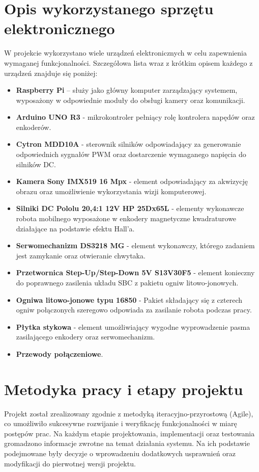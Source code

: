 \section{Opis wykorzystanego sprzętu elektronicznego}
W projekcie wykorzystano wiele urządzeń elektronicznych w celu zapewnienia wymaganej funkcjonalności. Szczegółowa lista wraz z krótkim opisem każdego z urządzeń znajduje się poniżej:

\begin{itemize}
    \item \textbf{Raspberry Pi} – służy jako główny komputer zarządzający systemem, wyposażony w odpowiednie moduły do obsługi kamery oraz komunikacji.
    \item \textbf{Arduino UNO R3} - mikrokontroler pełniący rolę kontrolera napędów oraz enkoderów.
    \item \textbf{Cytron MDD10A} - sterownik silników odpowiadający za generowanie odpowiednich sygnałów PWM oraz dostarczenie wymaganego napięcia do silników DC.
    \item \textbf{Kamera Sony IMX519 16 Mpx} - element odpowiadający za akwizycję obrazu oraz umożliwienie wykorzystania wizji komputerowej. 
    \item \textbf{Silniki DC Pololu 20,4:1 12V HP 25Dx65L} - elementy wykonawcze robota mobilnego wyposażone w enkodery magnetyczne kwadraturowe działające na podstawie efektu Hall'a.
    \item \textbf{Serwomechanizm DS3218 MG} - element wykonawczy, którego zadaniem jest zamykanie oraz otwieranie chwytaka.
    \item \textbf{Przetwornica Step-Up/Step-Down 5V S13V30F5} - element konieczny do poprawnego zasilenia układu SBC z pakietu ogniw litowo-jonowych.
    \item \textbf{Ogniwa litowo-jonowe typu 16850} - Pakiet składający się z czterech ogniw połączonych szeregowo odpowiada za zasilanie robota podczas pracy. 
    \item \textbf{Płytka stykowa} - element umożliwiający wygodne wyprowadzenie pasma zasilającego enkodery oraz serwomechanizm. 
    \item \textbf{Przewody połączeniowe}. 
    
\end{itemize}

\section{Metodyka pracy i etapy projektu}
Projekt został zrealizowany zgodnie z metodyką iteracyjno-przyrostową (Agile), co umożliwiło sukcesywne rozwijanie i weryfikację funkcjonalności w miarę postępów prac. Na każdym etapie projektowania, implementacji oraz testowania gromadzono informacje zwrotne na temat działania systemu. Na ich podstawie podejmowane były decyzje o wprowadzeniu dodatkowych usprawnień oraz modyfikacji do pierwotnej wersji projektu.

